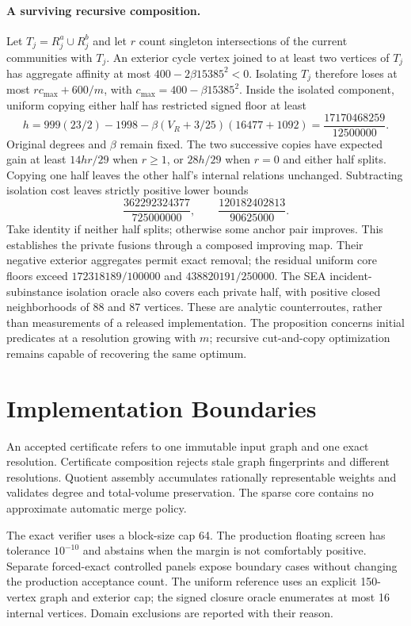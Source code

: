 \documentclass[sigconf,anonymous,review]{acmart}
\newcommand{\1}{\mathbf{1}}
\begin{document}
\paragraph{A surviving recursive composition.}
Let $T_j=R_j^a\cup R_j^b$ and let $r$ count singleton intersections
of the current communities with $T_j$.
An exterior cycle vertex joined to at least two vertices of $T_j$
has aggregate affinity at most $400-2\beta15385^2<0$.
Isolating $T_j$ therefore loses at most
$r c_{\max}+600/m$, with $c_{\max}=400-\beta15385^2$.
Inside the isolated component, uniform copying either half has
restricted signed floor at least
\[
 h=999(23/2)-1998-\beta(V_R+3/25)(16477+1092)
   =\frac{17170468259}{12500000}.
\]
Original degrees and $\beta$ remain fixed.
The two successive copies have expected gain at least $14hr/29$
when $r\ge1$, or $28h/29$ when $r=0$ and either half splits.
Copying one half leaves the other half's internal relations unchanged.
Subtracting isolation cost leaves strictly positive lower bounds
\[
 \frac{362292324377}{725000000},\qquad
 \frac{120182402813}{90625000}.
\]
Take identity if neither half splits; otherwise some anchor pair improves.
This establishes the private fusions through a composed improving map.
Their negative exterior aggregates permit exact removal; the residual
uniform core floors exceed $172318189/100000$ and $438820191/250000$.
The SEA incident-subinstance isolation oracle also covers each private
half, with positive closed neighborhoods of 88 and 87 vertices.
These are analytic counterroutes, rather than measurements of a released
implementation. The proposition concerns initial predicates at a resolution
growing with $m$; recursive cut-and-copy optimization remains capable of
recovering the same optimum.

\section{Implementation Boundaries}
An accepted certificate refers to one immutable input graph and one exact
resolution. Certificate composition rejects stale graph fingerprints and
different resolutions. Quotient assembly accumulates rationally representable
weights and validates degree and total-volume preservation. The sparse core
contains no approximate automatic merge policy.

The exact verifier uses a block-size cap 64. The production floating screen has
tolerance $10^{-10}$ and abstains when the margin is not comfortably positive.
Separate forced-exact controlled panels expose boundary cases without changing
the production acceptance count. The uniform reference uses an explicit
150-vertex graph and exterior cap; the signed closure oracle enumerates at
most 16 internal vertices. Domain exclusions are reported with their reason.
\end{document}
